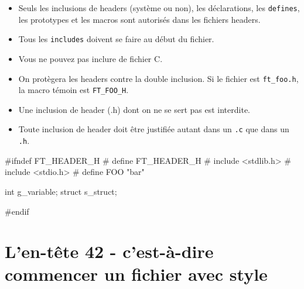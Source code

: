\documentclass{42-fr}
\begin{document}
        \begin{itemize}

            \item Seuls les inclusions de headers (système ou non),
                les déclarations, les \texttt{defines}, les prototypes et les macros
                sont autorisés dans les fichiers headers.

            \item Tous les \texttt{includes} doivent se faire au début du fichier.

            \item Vous ne pouvez pas inclure de fichier C.

            \item On protègera les headers contre la double inclusion. Si le fichier est
            \texttt{ft\_foo.h}, la macro témoin est \texttt{FT\_FOO\_H}.

            \item Une inclusion de header (.h) dont on ne se sert pas est interdite.

            \item Toute inclusion de header doit être justifiée autant dans un \texttt{.c}
                que dans un \texttt{.h}.

        \end{itemize}

        \begin{42ccode}
#ifndef FT_HEADER_H
# define FT_HEADER_H
# include <stdlib.h>
# include <stdio.h>
# define FOO "bar"

int g_variable;
struct s_struct;

#endif
        \end{42ccode}
        \newpage


    \section{L'en-tête 42 - c'est-à-dire commencer un fichier avec style}
\end{document}

